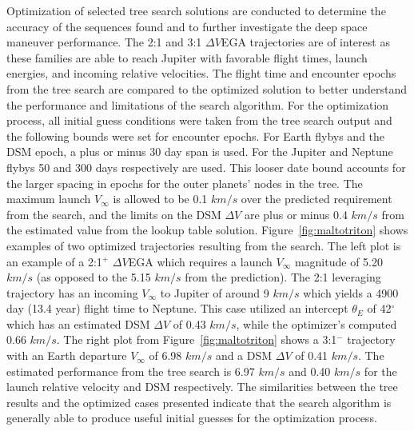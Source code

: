 \documentclass[letterpaper, preprint, paper,11pt]{AAS}	%
\begin{document}
Optimization of selected tree search solutions are conducted to determine the accuracy of the sequences found and to further investigate the deep space maneuver performance. The 2:1 and 3:1 $\Delta V$EGA trajectories are of interest as these families are able to reach Jupiter with favorable flight times, launch energies, and incoming relative velocities. The flight time and encounter epochs from the tree search are compared to the optimized solution to better understand the performance and limitations of the search algorithm. For the optimization process, all initial guess conditions were taken from the tree search output and the following bounds were set for encounter epochs. For Earth flybys and the DSM epoch, a plus or minus 30 day span is used. For the Jupiter and Neptune flybys 50 and 300 days respectively are used. This looser date bound accounts for the larger spacing in epochs for the outer planets' nodes in the tree. The maximum launch $V_\infty$ is allowed to be 0.1 $km/s$ over the predicted requirement from the search, and the limits on the DSM $\Delta V$ are plus or minus 0.4 $km/s$ from the estimated value from the lookup table solution. Figure~\ref{fig:maltotriton} shows examples of two optimized trajectories resulting from the search. The left plot is an example of a 2:1$^{+}$ $\Delta V$EGA which requires a launch $V_\infty$ magnitude of 5.20 $km/s$ (as opposed to the \hspace{0.5px} 5.15 $km/s$ from the prediction). The 2:1 leveraging trajectory has an incoming $V_\infty$ to Jupiter of around 9 $km/s$ which yields a 4900 day (13.4 year) flight time to Neptune. This case utilized an intercept $\theta_E$ of 42$^\circ$ which has an estimated DSM $\Delta V$ of 0.43 $km/s$, while the optimizer's computed 0.66 $km/s$. The right plot from Figure~\ref{fig:maltotriton} shows a 3:1$^{-}$ trajectory with an Earth departure $V_\infty$ of 6.98 $km/s$ and a DSM $\Delta V$ of 0.41 $km/s$. The estimated performance from the tree search is 6.97 $km/s$ and 0.40 $km/s$ for the launch relative velocity and DSM respectively. The similarities between the tree results and the optimized cases presented indicate that the search algorithm is generally able to produce useful initial guesses for the optimization process.
\end{document}

